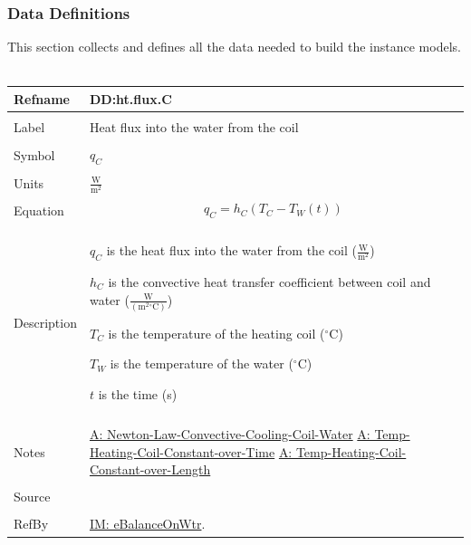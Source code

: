 \documentclass[12pt]{article}
\begin{document}
\subsubsection{Data Definitions}
\label{Sec:DDs}
This section collects and defines all the data needed to build the instance models.
~\newline
\noindent \begin{minipage}{\textwidth}
\begin{tabular}{p{} p{}}
\toprule \textbf{Refname} & \textbf{DD:ht.flux.C}
\label{DD:ht.flux.C}
\\ \midrule \\
Label & Heat flux into the water from the coil
\\ \midrule \\
Symbol & ${q_{C}}$
\\ \midrule \\
Units & $\frac{\text{W}}{\text{m}^{2}}$
\\ \midrule \\
Equation & \begin{dmath}
           {q_{C}}={h_{C}} \left({T_{C}}-{T_{W}}\left(t\right)\right)
           \end{dmath}
\\ \midrule \\
Description & \begin{symbDescription}
              \item{${q_{C}}$ is the heat flux into the water from the coil ($\frac{\text{W}}{\text{m}^{2}}$)}
              \item{${h_{C}}$ is the convective heat transfer coefficient between coil and water ($\frac{\text{W}}{(\text{m}^{2}{}^{\circ}\text{C})}$)}
              \item{${T_{C}}$ is the temperature of the heating coil (${}^{\circ}$C)}
              \item{${T_{W}}$ is the temperature of the water (${}^{\circ}$C)}
              \item{$t$ is the time (s)}
              \end{symbDescription}
\\ \midrule \\
Notes & \hyperref[A:Newton-Law-Convective-Cooling-Coil-Water]{A: Newton-Law-Convective-Cooling-Coil-Water}
        \hyperref[A:Temp-Heating-Coil-Constant-over-Time]{A: Temp-Heating-Coil-Constant-over-Time}
        \hyperref[A:Temp-Heating-Coil-Constant-over-Length]{A: Temp-Heating-Coil-Constant-over-Length}
\\ \midrule \\
Source & \cite{koothoor2013}
\\ \midrule \\
RefBy & \hyperref[IM:eBalanceOnWtr]{IM: eBalanceOnWtr}.
\\ \bottomrule \end{tabular}
\end{minipage}\\
\end{document}
